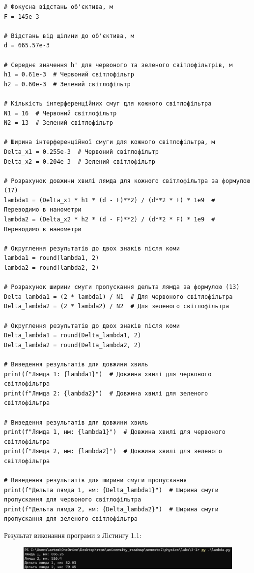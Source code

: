 \documentclass[12pt,a4paper]{article}
\begin{document}
    \small{ 

\begin{verbatim}
# Фокусна відстань об'єктива, м
F = 145e-3 

# Відстань від щілини до об'єктива, м
d = 665.57e-3 

# Середнє значення h' для червоного та зеленого світлофільтрів, м
h1 = 0.61e-3  # Червоний світлофільтр
h2 = 0.60e-3  # Зелений світлофільтр

# Кількість інтерференційних смуг для кожного світлофільтра
N1 = 16  # Червоний світлофільтр
N2 = 13  # Зелений світлофільтр

# Ширина інтерференційної смуги для кожного світлофільтра, м
Delta_x1 = 0.255e-3  # Червоний світлофільтр
Delta_x2 = 0.204e-3  # Зелений світлофільтр

# Розрахунок довжини хвилі лямда для кожного світлофільтра за формулою (17)
lambda1 = (Delta_x1 * h1 * (d - F)**2) / (d**2 * F) * 1e9  # Переводимо в нанометри
lambda2 = (Delta_x2 * h2 * (d - F)**2) / (d**2 * F) * 1e9  # Переводимо в нанометри

# Округлення результатів до двох знаків після коми
lambda1 = round(lambda1, 2)
lambda2 = round(lambda2, 2)

# Розрахунок ширини смуги пропускання дельта лямда за формулою (13)
Delta_lambda1 = (2 * lambda1) / N1  # Для червоного світлофільтра
Delta_lambda2 = (2 * lambda2) / N2  # Для зеленого світлофільтра

# Округлення результатів до двох знаків після коми
Delta_lambda1 = round(Delta_lambda1, 2)
Delta_lambda2 = round(Delta_lambda2, 2)

# Виведення результатів для довжини хвиль
print(f"Лямда 1: {lambda1}")  # Довжина хвилі для червоного світлофільтра
print(f"Лямда 2: {lambda2}")  # Довжина хвилі для зеленого світлофільтра

# Виведення результатів для довжини хвиль
print(f"Лямда 1, нм: {lambda1}")  # Довжина хвилі для червоного
світлофільтра
print(f"Лямда 2, нм: {lambda2}")  # Довжина хвилі для зеленого
світлофільтра

# Виведення результатів для ширини смуги пропускання
print(f"Дельта лямда 1, нм: {Delta_lambda1}")  # Ширина смуги
пропускання для червоного світлофільтра
print(f"Дельта лямда 2, нм: {Delta_lambda2}")  # Ширина смуги
пропускання для зеленого світлофільтра
\end{verbatim}
}

    \newpage

    Результат виконання програми з Лістингу 1.1:
    \begin{figure}[ht]
        \includegraphics[width=1.0\textwidth]{listing1.png}
    \end{figure}
\end{document}
